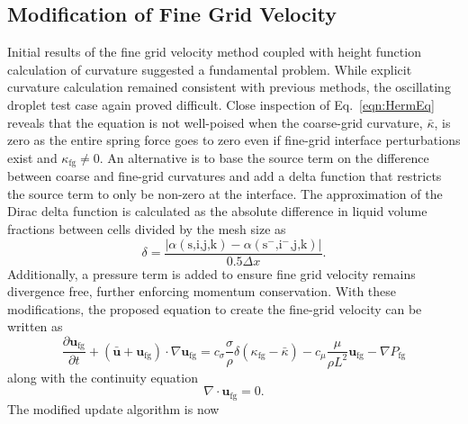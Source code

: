 \subsection{Modification of Fine Grid Velocity}
Initial results of the fine grid velocity method coupled with height function calculation of curvature suggested a fundamental problem. While explicit curvature calculation remained consistent with previous methods, the oscillating droplet test case again proved difficult. Close inspection of Eq.~\ref{eqn:HermEq} reveals that the equation is not well-poised when the coarse-grid curvature, $\bar{\kappa}$, is zero as the entire spring force goes to zero even if fine-grid interface perturbations exist and $\kappa_{\text{fg}} \neq 0$.  An alternative is to base the source term on the difference between coarse and fine-grid curvatures and add a delta function that restricts the source term to only be non-zero at the interface.  The approximation of the Dirac delta function is calculated as the absolute difference in liquid volume fractions between cells divided by the mesh size as
\begin{equation}
\delta = \frac{|\alpha(\text{s,i,j,k}) - \alpha(\text{s$^-$,i$^-$,j,k}) | }{0.5 \Delta x}.
\label{eqn:delta}
\end{equation}
Additionally, a pressure term is added to ensure fine grid velocity remains divergence free, further enforcing momentum conservation. With these modifications, the proposed equation to create the fine-grid velocity can be written as
\begin{equation}
\frac{\partial \bm{u}_{\text{fg}}}{\partial t} +
(\bar{\bm{u}}+\bm{u}_{\text{fg}}) \cdot \nabla \bm{u}_{\text{fg}} = 
c_{\sigma}\frac{\sigma}{\rho}\delta(\kappa_{\text{fg}}-\bar{\kappa})- 
c_{\mu}\frac{\mu}{\rho L^2}\bm{u}_{\text{fg}} -
\nabla P_{\text{fg}}
\label{eqn:MyEq}
\end{equation}
along with the continuity equation
\begin{equation}
\nabla\cdot\bm{u}_\text{fg}=0.
\end{equation}
The modified update algorithm is now
